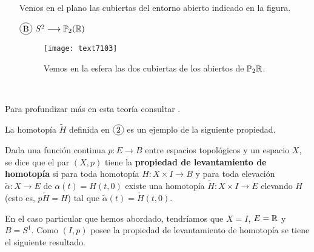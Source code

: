 \documentclass[GTS.tex]{subfiles}
\begin{document}
\begin{nota}
\begin{itemize}

Vemos en el plano las cubiertas del entorno abierto indicado en la figura.
\vspace{0.2cm}

\item[$\circled{B}$] $S^2\longrightarrow\mathbb{P}_2(\mathbb{R})$
\begin{figure}[h!]
	\texttt{[image: text7103]}
	
Vemos en la esfera las dos cubiertas de los abiertos de $\mathbb{P}_2\mathbb{R}$.
\end{figure}\
\end{itemize}
Para profundizar más en esta teoría consultar \cite{Hatcher}.
\end{nota}


La homotopía $\widetilde{H}$ definida en $\circled{2}$ es un ejemplo de la siguiente propiedad.

\begin{defi}
Dada una función continua $p:E\to B$ entre espacios topológicos y un espacio $X$, se dice que el par $(X,p)$ tiene la \textbf{propiedad de levantamiento de homotopía} si para toda homotopía $H:X\times I\to B$ y para toda elevación $\tilde{\alpha}:X\to E$ de $\alpha(t)=H(t,0)$ existe una homotopía $\widetilde{H}:X\times I\to E$ elevando $H$ (esto es, $p\widetilde{H}=H$) tal que $\tilde{\alpha}(t)=\widetilde{H}(t,0)$. 
\end{defi}

En el caso particular que hemos abordado, tendríamos que $X=I$, $E=\mathbb{R}$ y $B=S^1$. Como $(I,p)$ posee la propiedad de levantamiento de homotopía se tiene el siguiente resultado. 
\end{document}
